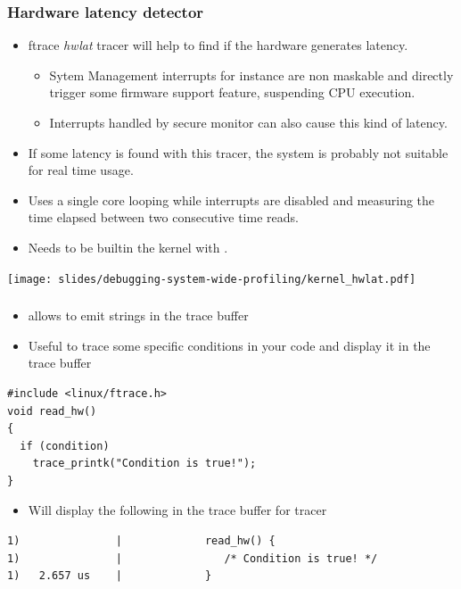\begin{frame}
  \frametitle{Hardware latency detector}
  \begin{itemize}
    \item ftrace {\em hwlat} tracer will help to find if the hardware generates
          latency.
    \begin{itemize}
      \item Sytem Management interrupts for instance are non maskable and
            directly trigger some firmware support feature, suspending CPU execution.
      \item Interrupts handled by secure monitor can also cause this kind of
            latency.
    \end{itemize}
    \item If some latency is found with this tracer, the system is probably
          not suitable for real time usage.
    \item Uses a single core looping while interrupts are disabled and measuring
          the time elapsed between two consecutive time reads.
    \item Needs to be builtin the kernel with .
  \end{itemize}

  \center\texttt{[image: slides/debugging-system-wide-profiling/kernel\_hwlat.pdf]}
\end{frame}

\begin{frame}[fragile]
  \frametitle{}
  \begin{itemize}
    \item {} allows to emit strings in the trace buffer
    \item Useful to trace some specific conditions in your code and display it in the trace buffer 
  \end{itemize}
  \begin{block}{}
    \begin{verbatim}
#include <linux/ftrace.h>
void read_hw()
{
  if (condition)
    trace_printk("Condition is true!");
}
    \end{verbatim}
  \end{block}
  \begin{itemize}
    \item Will display the following in the trace buffer for  tracer
  \end{itemize}
  \begin{block}{}
    \begin{verbatim}
1)               |             read_hw() {
1)               |                /* Condition is true! */
1)   2.657 us    |             }
    \end{verbatim}
  \end{block}
\end{frame}

